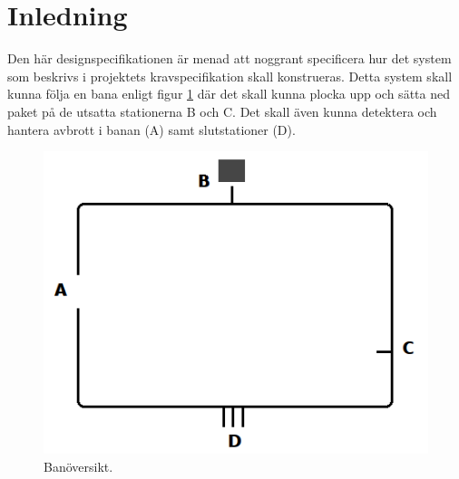 \section{Inledning}
Den här designspecifikationen är menad att noggrant specificera hur det system som beskrivs i projektets kravspecifikation  skall konstrueras. Detta system skall kunna följa en bana enligt figur \ref{systemskiss:banoversikt} där det skall kunna plocka upp och sätta ned paket på de utsatta stationerna B och C. Det skall även kunna detektera och hantera avbrott i banan (A) samt slutstationer (D). 

\begin{figure}[h]
\center
\includegraphics[scale=0.4]{figur}
\caption{Banöversikt.} \label{systemskiss:banoversikt}
\end{figure}